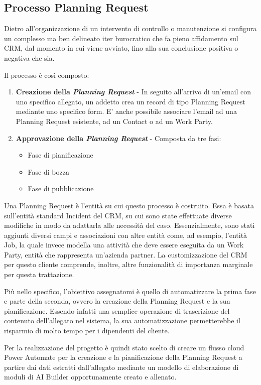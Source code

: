 \subsection{Processo Planning Request}
Dietro all'organizzazione di un intervento di controllo o manutenzione si configura un complesso ma ben delineato iter burocratico che fa pieno affidamento sul CRM, dal momento in cui viene avviato, fino alla sua conclusione positiva o negativa che sia.

Il processo è così composto:
\begin{enumerate}
  \item \textbf{Creazione della \textit{Planning Request}} - In seguito all'arrivo di un'email con uno specifico allegato, un addetto crea un record di tipo Planning Request mediante uno specifico form. E' anche possibile associare l'email ad una Planning Request esistente, ad un Contact o ad un Work Party. 
  \item \textbf{Approvazione della \textit{Planning Request}} - Composta da tre fasi:
  \begin{itemize} 
          \item Fase di pianificazione
          \item Fase di bozza
          \item Fase di pubblicazione
  \end{itemize}
\end{enumerate}

Una Planning Request è l'entità su cui questo processo è costruito. Essa è basata sull'entità standard Incident del CRM, su cui sono state effettuate diverse modifiche in modo da adattarla alle necessità del caso. Essenzialmente, sono stati aggiunti diversi campi e associazioni con altre entità come, ad esempio, l'entità Job, la quale invece modella una attività che deve essere eseguita da un Work Party, entità che rappresenta un'azienda partner.
La customizzazione del CRM per questo cliente comprende, inoltre, altre funzionalità di importanza marginale per questa trattazione.

Più nello specifico, l'obiettivo assegnatomi è quello di automatizzare la prima fase e parte della seconda, ovvero la creazione della Planning Request e la sua pianificazione. Essendo infatti una semplice operazione di trascrizione del contenuto dell'allegato nel sistema, la sua automatizzazione permetterebbe il risparmio di molto tempo per i dipendenti del cliente.

Per la realizzazione del progetto è quindi stato scelto di creare un flusso cloud Power Automate per la creazione e la pianificazione della Planning Request a partire dai dati estratti dall'allegato mediante un modello di elaborazione di moduli di AI Builder opportunamente creato e allenato.

